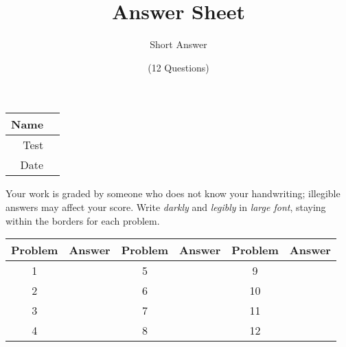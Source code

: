 \documentclass[a4paper, 12pt]{article}
\title{Answer Sheet}
\author{Short Answer}
\date{(12 Questions)}
\begin{document}
\maketitle

\begin{center}
\begin{tabular}{|r|r|}
\hline
	\hspace{3em} Name & \hspace{30em} \\\hline
	Test & \qquad \\ \hline
	Date & \qquad \\ \hline
\end{tabular}
\end{center}

Your work is graded by someone who does not know your handwriting; illegible answers may affect your score. Write \emph{darkly} and \emph{legibly} in \emph{large font}, staying within the borders for each problem.

\begin{center}
\begin{tabularx}{\textwidth}{|c|X|c|X|c|X|}\hline
	Problem & Answer & Problem & Answer & Problem & Answer \\\hline
	1 & \hspace{13.45em} & 5 & & 9 & \\\hline
	2 & & 6 & & 10 & \\\hline
	3 & & 7 & & 11 & \\\hline
	4 & & 8 & & 12 & \\\hline
\end{tabularx}
\end{center}
\end{document}
